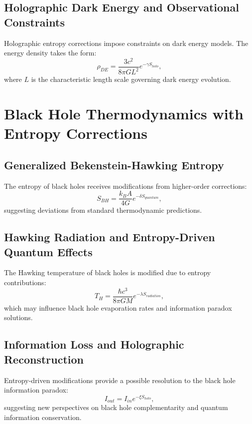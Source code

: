 \documentclass{article}
\begin{document}
\subsection{Holographic Dark Energy and Observational Constraints}
Holographic entropy corrections impose constraints on dark energy models. The energy density takes the form:
\begin{equation}
\rho_{DE} = \frac{3c^2}{8\pi G L^2} e^{-\gamma S_{holo}},
\end{equation}
where $L$ is the characteristic length scale governing dark energy evolution.

\section{Black Hole Thermodynamics with Entropy Corrections}

\subsection{Generalized Bekenstein-Hawking Entropy}
The entropy of black holes receives modifications from higher-order corrections:
\begin{equation}
S_{BH} = \frac{k_B A}{4G} e^{-\delta S_{quantum}},
\end{equation}
suggesting deviations from standard thermodynamic predictions.

\subsection{Hawking Radiation and Entropy-Driven Quantum Effects}
The Hawking temperature of black holes is modified due to entropy contributions:
\begin{equation}
T_H = \frac{\hbar c^3}{8\pi G M} e^{-\lambda S_{radiation}},
\end{equation}
which may influence black hole evaporation rates and information paradox solutions.

\subsection{Information Loss and Holographic Reconstruction}
Entropy-driven modifications provide a possible resolution to the black hole information paradox:
\begin{equation}
I_{out} = I_{in} e^{-\xi S_{holo}},
\end{equation}
suggesting new perspectives on black hole complementarity and quantum information conservation.
\end{document}
